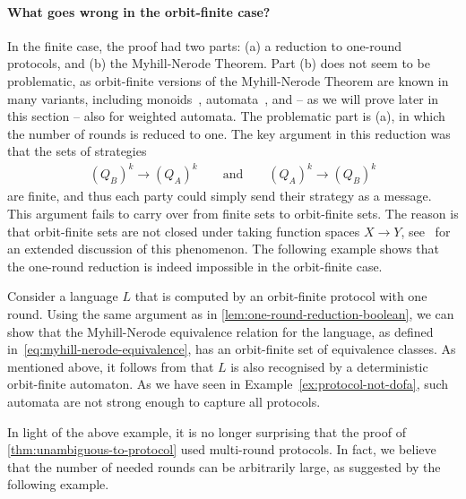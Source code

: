 \paragraph*{What goes wrong in the orbit-finite case?}
In the finite case, the proof had two parts: (a) a reduction to one-round protocols, and (b) the Myhill-Nerode Theorem. Part (b) does not seem to be problematic, as orbit-finite versions of the Myhill-Nerode Theorem are known in many variants, including monoids~\cite[Lemma 3.3]{bojanczykNominalMonoids2013}, automata~\cite[Section 3.2]{bojanczykAutomataTheoryNominal2014}, and -- as we will prove later in this section -- also for weighted automata. The problematic part is (a), in which the number of rounds is reduced to one. The key argument in this reduction  was that the sets of strategies 
  \begin{align*}
    (Q_B)^k \to (Q_A)^k \qquad \text{and} \qquad (Q_A)^k \to (Q_B)^k
    \end{align*}
are finite, and thus each party could simply send their strategy as a message.  This argument fails to carry over from finite sets to orbit-finite sets. The reason is  that orbit-finite sets are not closed under taking function spaces $X \to Y$, see~\cite{functionSpaces2024} for an extended discussion of this phenomenon.  The following example shows that the one-round reduction is indeed impossible in the orbit-finite case.

\begin{myexample}
    \label{ex:no-one-round-reduction} Consider a language $L$ that is computed by an orbit-finite protocol with one round. Using the same argument as in \cref{lem:one-round-reduction-boolean}, we can show that the Myhill-Nerode equivalence relation for the language, as defined in~\eqref{eq:myhill-nerode-equivalence}, has an orbit-finite set of equivalence classes. As mentioned above, it follows from \cite[Section 3.2]{bojanczykAutomataTheoryNominal2014} that $L$ is also recognised by a deterministic orbit-finite automaton. As we have seen in Example~\ref{ex:protocol-not-dofa}, such automata are not strong enough to capture all protocols.
\end{myexample}

In light of the above example, it is no longer surprising that the proof of \cref{thm:unambiguous-to-protocol} used multi-round protocols. In fact, we believe that the number of needed rounds can be arbitrarily large, as suggested by the following example. 

